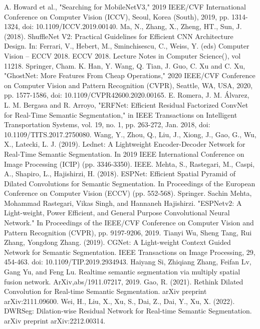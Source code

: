 \documentclass[11pt]{article}
\begin{document}
\begin{thebibliography}{99}
        A. Howard et al., "Searching for MobileNetV3," 2019 IEEE/CVF International Conference on Computer Vision (ICCV), Seoul, Korea (South), 2019, pp. 1314-1324, doi: 10.1109/ICCV.2019.00140.
        Ma, N., Zhang, X., Zheng, HT., Sun, J. (2018). ShuffleNet V2: Practical Guidelines for Efficient CNN Architecture Design. In: Ferrari, V., Hebert, M., Sminchisescu, C., Weiss, Y. (eds) Computer Vision – ECCV 2018. ECCV 2018. Lecture Notes in Computer Science(), vol 11218. Springer, Cham. 
        K. Han, Y. Wang, Q. Tian, J. Guo, C. Xu and C. Xu, "GhostNet: More Features From Cheap Operations," 2020 IEEE/CVF Conference on Computer Vision and Pattern Recognition (CVPR), Seattle, WA, USA, 2020, pp. 1577-1586, doi: 10.1109/CVPR42600.2020.00165.
        E. Romera, J. M. Álvarez, L. M. Bergasa and R. Arroyo, "ERFNet: Efficient Residual Factorized ConvNet for Real-Time Semantic Segmentation," in IEEE Transactions on Intelligent Transportation Systems, vol. 19, no. 1, pp. 263-272, Jan. 2018, doi: 10.1109/TITS.2017.2750080.
        Wang, Y., Zhou, Q., Liu, J., Xiong, J., Gao, G., Wu, X., Latecki, L. J. (2019). Lednet: A Lightweight Encoder-Decoder Network for Real-Time Semantic Segmentation. In 2019 IEEE International Conference on Image Processing (ICIP) (pp. 3346-3350). IEEE.
        Mehta, S., Rastegari, M., Caspi, A., Shapiro, L., Hajishirzi, H. (2018). ESPNet: Efficient Spatial Pyramid of Dilated Convolutions for Semantic Segmentation. In Proceedings of the European Conference on Computer Vision (ECCV) (pp. 552-568). Springer.
        Sachin Mehta, Mohammad Rastegari, Vikas Singh, and Hannaneh Hajishirzi. "ESPNetv2: A Light-weight, Power Efficient, and General Purpose Convolutional Neural Network." In Proceedings of the IEEE/CVF Conference on Computer Vision and Pattern Recognition (CVPR), pp. 9197-9206, 2019.
        Tianyi Wu, Sheng Tang, Rui Zhang, Yongdong Zhang. (2019). CGNet: A Light-weight Context Guided Network for Semantic Segmentation. IEEE Transactions on Image Processing, 29, 454-463. doi: 10.1109/TIP.2019.2934943.
        Haiyang Si, Zhiqiang Zhang, Feifan Lv, Gang Yu, and Feng Lu. Realtime semantic segmentation via multiply spatial fusion network. ArXiv,abs/1911.07217, 2019.
        Gao, R. (2021). Rethink Dilated Convolution for Real-time Semantic Segmentation. arXiv preprint arXiv:2111.09600.
        Wei, H., Liu, X., Xu, S., Dai, Z., Dai, Y., Xu, X. (2022). DWRSeg: Dilation-wise Residual Network for Real-time Semantic Segmentation. arXiv preprint arXiv:2212.00314.

\end{thebibliography}
\end{document}
